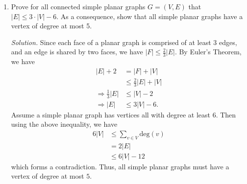 \documentclass[11pt,letterpaper]{article}
\newenvironment{solution}{\color{teal}\textit{Solution.}}{\color{black}}
\begin{document}
\begin{enumerate}
\begin{enumerate}
	\item Let $G = (\binom{[5]}{2},E)$ where $(A,B) \in E$ if and only if $A \cap B \neq \varnothing$.
	Determine the chromatic number of $G$.
	For example, $(\{1,2\},\{2,4\}) \in E$ but $(\{1,2\},\{3,4\}) \notin E$. 
	Is $G$ planar?\\

	\begin{solution}
		We will prove that $G$ is not planar by contradiction. Assume that $G$ is planar, and let $V=\binom{[5]}{2}$ so that $|V|=\binom{5}{2}=10$. Note that for any particular integer from $1$ to $5$, we have $4$ elements of $V$ containing that integer. Hence, for $\{a,b\}\in{V}$, $a$ is shared by $3$ other elements of $V$, and $b$ is shared by $3$ elements of $V$ (distinct from those sharing a). Thus for all $v\in{V}$, we have $\text{deg}(v)=6$. An edge is shared by two vertices, so $|E|=\frac{1}{2}\cdot{\text{deg}(v)\cdot |V|}=30$. By Euler's Theorem on planar graphs, we have $|F|=|E|-|V|+2=22$.

		However, we also know that a face is composed of at least 3 edges, and an edge is shared by two faces. Thus $|E|\geq \frac{3}{2}|F|$. But $\frac{3}{2}|F|=33>30$. We have a contradiction, so $G$ cannot be planar.
	\end{solution}

\end{enumerate}
	\item Prove for all connected simple planar graphs $G = (V,E)$ that $|E| \leq 3 \cdot |V| - 6$.
	As a consequence, show that all simple planar graphs have a vertex of degree at most 5.

	\begin{solution}
		Since each face of a planar graph is comprised of at least 3 edges, and an edge is shared by two faces, we have $|F|\leq \frac{2}{3}|E|$. By Euler's Theorem, we have
		\begin{align*}
			|E|+2 &= |F|+|V| \\
			&\leq{} \frac{2}{3}|E|+|V| \\
			\Rightarrow \frac{1}{3}|E| &\leq |V|-2 \\
			\Rightarrow |E| &\leq 3|V|-6.
		\end{align*}
		Assume a simple planar graph has vertices all with degree at least $6$. Then using the above inequality, we have
		\begin{align*}
			6|V| &\leq \sum_{v\in V}{\text{deg}(v)} \\
			&= 2|E| \\
			&\leq 6|V|-12
		\end{align*}
		which forms a contradiction. Thus, all simple planar graphs must have a vertex of degree at most $5$.
	\end{solution}
	

\end{enumerate}
\end{document}

